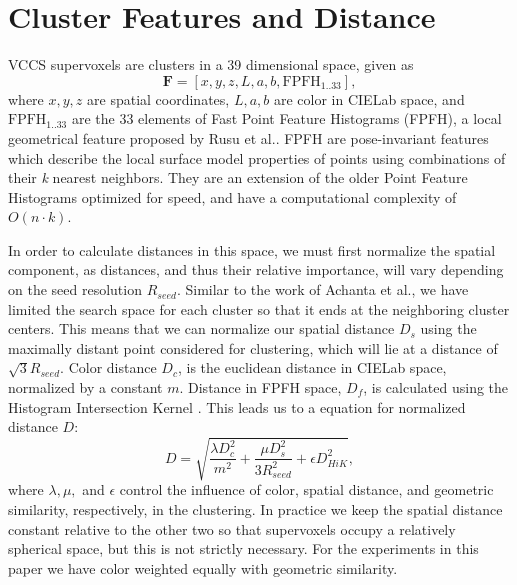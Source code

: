 \section{Cluster Features and Distance}
\label{subsec:Features}
VCCS supervoxels are clusters in a 39 dimensional space, given as 
\begin{equation}
\label{eqn:FeatureSpace}
\mathbf{F} = [x,y,z,L,a,b,\textrm{FPFH}_{1..33}],
\end{equation}
where $x,y,z$ are spatial coordinates, $L,a,b$ are color in CIELab space, and $\textrm{FPFH}_{1..33}$ are the 33 elements of Fast Point Feature Histograms (FPFH), a local geometrical feature proposed by Rusu et al.\@ \cite{FPFH}. FPFH are pose-invariant features which describe the local surface model properties of points using combinations of their \textit{k} nearest neighbors. They are an extension of the older Point Feature Histograms optimized for speed, and have a computational complexity of $O(n \cdot k)$.  

In order to calculate distances in this space, we must first normalize the spatial component, as distances, and thus their relative importance, will vary depending on the seed resolution ${R}_{seed}$. Similar to the work of Achanta et al.\@, \cite{SLICCompared} we have limited the search space for each cluster so that it ends at the neighboring cluster centers. This means that we can normalize our spatial distance $D_s$ using the maximally distant point considered for clustering, which will lie at a distance of $\sqrt{3} {R}_{seed}$. Color distance $D_c$, is the euclidean distance in CIELab space, normalized by a constant $m$. Distance in FPFH space, $D_f$, is calculated using the Histogram Intersection Kernel \cite{HistogramIntersection}. This leads us to a equation for normalized distance $D$:
\begin{equation}
\label{eqn:Distance}
D = \sqrt{\frac{\lambda D_c^2}{m^2}+\frac{\mu D_s^2}{3 {R}_{seed}^{2}}+\epsilon {D}_{HiK}^{2}},
\end{equation}
where $\lambda,\mu,$ and $\epsilon$ control the influence of color, spatial distance, and geometric similarity, respectively, in the clustering. In practice we keep the spatial distance constant relative to the other two so that supervoxels occupy a relatively spherical space, but this is not strictly necessary. For the experiments in this paper we have color weighted equally with geometric similarity.

